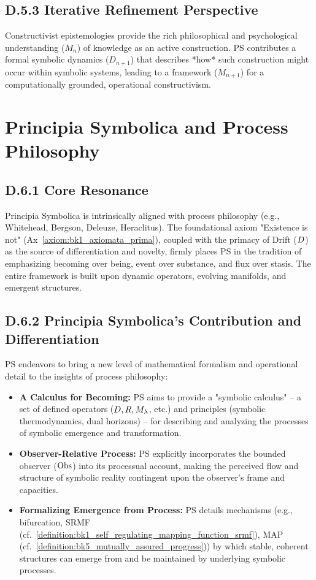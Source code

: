 \subsection*{D.5.3 Iterative Refinement Perspective}
\label{subsec:appD_constructivist_iterative_refinement_perspective}
Constructivist epistemologies provide the rich philosophical and psychological understanding (\(M_n\)) of knowledge as an active construction. PS contributes a formal symbolic dynamics (\(D_{n+1}\)) that describes *how* such construction might occur within symbolic systems, leading to a framework (\(M_{n+1}\)) for a computationally grounded, operational constructivism.
\section*{Principia Symbolica and Process Philosophy} \label{sec:appD_ps_and_process_philosophy}
\subsection*{D.6.1 Core Resonance}
\label{subsec:appD_process_philosophy_core_resonance}
Principia Symbolica is intrinsically aligned with process philosophy \cite{whitehead1929} (e.g., Whitehead, Bergson, Deleuze, Heraclitus). The foundational axiom "Existence is not" (Ax~\ref{axiom:bk1_axiomata_prima}), coupled with the primacy of Drift (\(D\)) as the source of differentiation and novelty, firmly places PS in the tradition of emphasizing becoming over being, event over substance, and flux over stasis. The entire framework is built upon dynamic operators, evolving manifolds, and emergent structures.
\subsection*{D.6.2 Principia Symbolica's Contribution and Differentiation} \label{subsec:appD_process_philosophy_contribution_differentiation}
PS endeavors to bring a new level of mathematical formalism and operational detail to the insights of process philosophy:
\begin{itemize}
    \item \textbf{A Calculus for Becoming:} PS aims to provide a "symbolic calculus" – a set of defined operators (\(D, R, M_\lambda\), etc.) and principles (symbolic thermodynamics, dual horizons) – for describing and analyzing the processes of symbolic emergence and transformation.
    \item \textbf{Observer-Relative Process:} PS explicitly incorporates the bounded observer (\(\mathrm{Obs}\)) into its processual account, making the perceived flow and structure of symbolic reality contingent upon the observer's frame and capacities.
    \item \textbf{Formalizing Emergence from Process:} PS details mechanisms (e.g., bifurcation, SRMF (cf.~\ref{definition:bk1_self_regulating_mapping_function_srmf}), MAP (cf.~\ref{definition:bk5_mutually_assured_progress})) by which stable, coherent structures can emerge from and be maintained by underlying symbolic processes.
\end{itemize}
